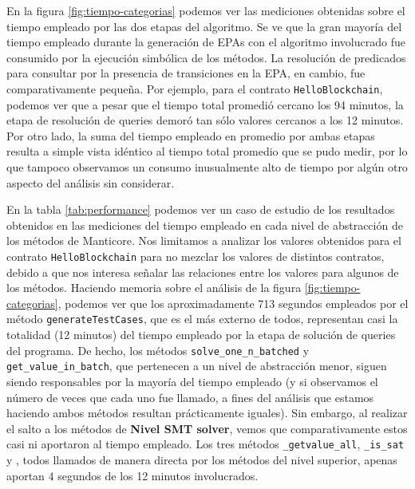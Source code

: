 En la figura \ref{fig:tiempo-categorias} podemos ver las mediciones obtenidas sobre el tiempo empleado por las dos etapas del algoritmo.
Se ve que la gran mayoría del tiempo empleado durante la generación de EPAs con el algoritmo involucrado fue consumido por la ejecución simbólica de los métodos.
La resolución de predicados para consultar por la presencia de transiciones en la EPA, en cambio, fue comparativamente pequeña.
Por ejemplo, para el contrato \texttt{HelloBlockchain}, podemos ver que a pesar que el tiempo total promedió cercano los 94 minutos, la etapa de resolución de queries demoró tan sólo valores cercanos a los 12 minutos.
Por otro lado, la suma del tiempo empleado en promedio por ambas etapas resulta a simple vista idéntico al tiempo total promedio que se pudo medir, por lo que tampoco observamos un consumo inusualmente alto de tiempo por algún otro aspecto del análisis sin considerar.

En la tabla \ref{tab:performance} podemos ver un caso de estudio de los resultados obtenidos en las mediciones del tiempo empleado en cada nivel de abstracción de los métodos de Manticore.
Nos limitamos a analizar los valores obtenidos para el contrato \texttt{HelloBlockchain} para no mezclar los valores de distintos contratos, debido a que nos interesa señalar las relaciones entre los valores para algunos de los métodos.
Haciendo memoria sobre el análisis de la figura \ref{fig:tiempo-categorias}, podemos ver que los aproximadamente 713 segundos empleados por el método \texttt{generateTestCases}, que es el más externo de todos, representan casi la totalidad (12 minutos) del tiempo empleado por la etapa de solución de queries del programa.
De hecho, los métodos \texttt{solve\_one\_n\_batched} y \texttt{get\_value\_in\_batch}, que pertenecen a un nivel de abstracción menor, siguen siendo responsables por la mayoría del tiempo empleado (y si observamos el número de veces que cada uno fue llamado, a fines del análisis que estamos haciendo ambos métodos resultan prácticamente iguales).
Sin embargo, al realizar el salto a los métodos de \textbf{Nivel SMT solver}, vemos que comparativamente estos casi ni aportaron al tiempo empleado.
Los tres métodos \texttt{\_getvalue\_all}, \texttt{\_is\_sat} y , todos llamados de manera directa por los métodos del nivel superior, apenas aportan 4 segundos de los 12 minutos involucrados.

